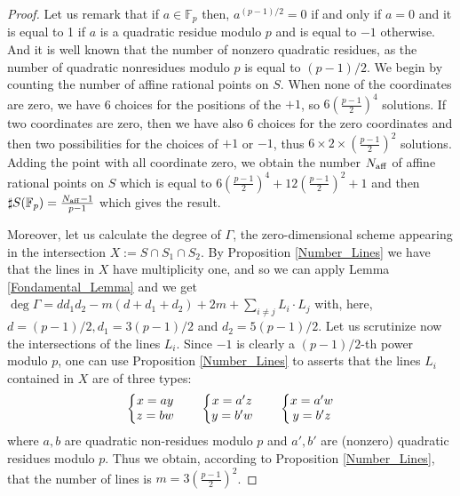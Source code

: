 \documentclass[12pt]{amsart}
\theoremstyle{definition}
\begin{document}
\begin{proof}
Let us remark that if $a\in{\mathbb F}_p$ then, $a^{(p-1)/2}=0$ if and only if $a=0$ and  it is equal to 1 if $a$ is a quadratic residue modulo $p$ and is equal to $-1$ otherwise. And it is well known that the number of nonzero quadratic residues, as the number of  quadratic nonresidues modulo $p$ is equal to $(p-1)/2$. We begin by counting the number of affine rational points on $S$. When none of the coordinates are zero, we have 6 choices for the positions of the $+1$, so $6(\frac{p-1}{2})^4$ solutions. If two coordinates are zero, then we have also 6 choices for the zero coordinates and then two possibilities for the choices of $+1$ or $-1$, thus $6\times 2 \times (\frac{p-1}{2})^2$ solutions. Adding the point with all coordinate zero, we obtain the number $N_{\rm aff}$ of affine rational points on $S$ which is equal to 
$6(\frac{p-1}{2})^4+12 (\frac{p-1}{2})^2+1$ and then $\sharp S({\mathbb F}_p) =\frac{N_{\rm aff}-1}{p-1}$ which gives the result.

Moreover, let us calculate the degree of $\Gamma$, the zero-dimensional scheme appearing in the intersection 
$X:=S\cap S_1\cap S_2$.
By Proposition \ref{Number_Lines} we have that the lines  
in $X$ have multiplicity one, and so we can apply
Lemma \ref{Fondamental_Lemma} and we get
$\deg\Gamma=dd_1d_2 - m(d+d_1+d_2)+2m+ \sum_{i \ne j} L_i\cdot L_j$
with, here, $d=(p-1)/2, d_1=3(p-1)/2$ and $d_2=5(p-1)/2$. Let us scrutinize now the intersections of the lines $L_i$.
Since $-1$ is clearly a $(p-1)/2$-th power modulo $p$, one can use
 Proposition \ref{Number_Lines} to asserts that the lines $L_i$ contained in  $X$
 are of three types:
\begin{equation*}
\left\{
\begin{matrix}
x = ay   \\
z = bw \cr
\end{matrix}
\right.
\qquad
\left\{
\begin{matrix}
x = a'z   \\
y = b'w\cr
\end{matrix}
\right. 
\qquad
\left\{
\begin{matrix}
x = a' w   \\
y = b'z \cr
\end{matrix}
\right. 
\end{equation*}
where $a,b$ are quadratic non-residues modulo $p$ and $a',b'$ are (nonzero) quadratic residues modulo $p$.
Thus we obtain, according to Proposition \ref{Number_Lines}, that  the number of lines is $m=3(\frac{p-1}{2})^2$.


\end{proof}
\end{document}
